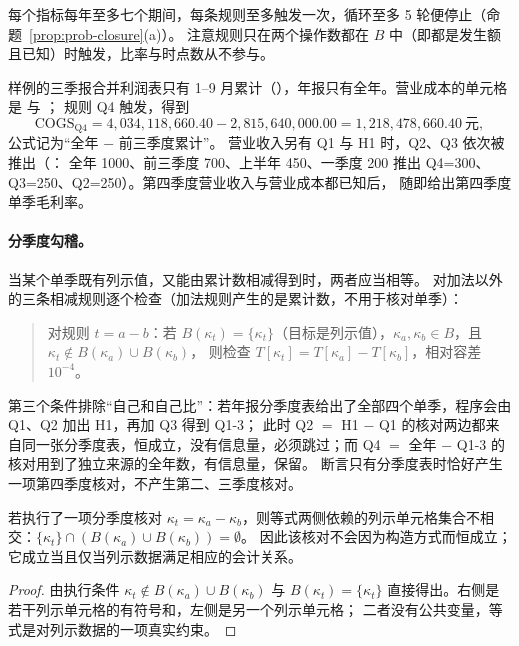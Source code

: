 每个指标每年至多七个期间，每条规则至多触发一次，循环至多 5 轮便停止（命题~\ref{prop:prob-closure}(a)）。
注意规则只在两个操作数都在 $B$ 中（即都是发生额且已知）时触发，比率与时点数从不参与。

\begin{example}[样例：年报 + 三季报]
样例的三季报合并利润表只有 1--9 月累计（），年报只有全年。营业成本的单元格是  与 ；
规则 Q4 触发，得到\[\text{COGS}_{\text{Q4}}=4{,}034{,}118{,}660.40-2{,}815{,}640{,}000.00=1{,}218{,}478{,}660.40\ \text{元},\]公式记为“全年 − 前三季度累计”。
营业收入另有 Q1 与 H1 时，Q2、Q3 依次被推出（：
全年 1000、前三季度 700、上半年 450、一季度 200 推出 Q4=300、Q3=250、Q2=250）。第四季度营业收入与营业成本都已知后， 随即给出第四季度单季毛利率。
\end{example}

\paragraph{分季度勾稽。}
当某个单季既有列示值，又能由累计数相减得到时，两者应当相等。 对加法以外的三条相减规则逐个检查（加法规则产生的是累计数，不用于核对单季）：
\begin{quote}
对规则 $t=a-b$：若 $B(\kappa_t)=\{\kappa_t\}$（目标是列示值），$\kappa_a,\kappa_b\in B$，且 $\kappa_t\notin B(\kappa_a)\cup B(\kappa_b)$，
则检查 $T[\kappa_t]=T[\kappa_a]-T[\kappa_b]$，相对容差 $10^{-4}$。
\end{quote}
第三个条件排除“自己和自己比”：若年报分季度表给出了全部四个单季，程序会由 Q1、Q2 加出 H1，再加 Q3 得到 Q1-3；
此时 Q2 $=$ H1 $-$ Q1 的核对两边都来自同一张分季度表，恒成立，没有信息量，必须跳过；而 Q4 $=$ 全年 $-$ Q1-3 的核对用到了独立来源的全年数，有信息量，保留。
 断言只有分季度表时恰好产生一项第四季度核对，不产生第二、三季度核对。

\begin{proposition}[分季度核对的非平凡性]
\label{prop:an-nontrivial}
若执行了一项分季度核对 $\kappa_t=\kappa_a-\kappa_b$，则等式两侧依赖的列示单元格集合不相交：$\{\kappa_t\}\cap(B(\kappa_a)\cup B(\kappa_b))=\emptyset$。
因此该核对不会因为构造方式而恒成立；它成立当且仅当列示数据满足相应的会计关系。
\end{proposition}
\begin{proof}
由执行条件 $\kappa_t\notin B(\kappa_a)\cup B(\kappa_b)$ 与 $B(\kappa_t)=\{\kappa_t\}$ 直接得出。右侧是若干列示单元格的有符号和，左侧是另一个列示单元格；
二者没有公共变量，等式是对列示数据的一项真实约束。
\end{proof}

